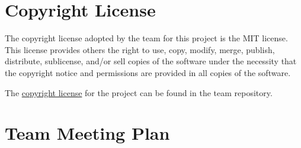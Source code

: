\documentclass{article}
\begin{document}
\section{Copyright License}
The copyright license adopted by the team for this project is the MIT license.
This license provides others the right to use, copy, modify, merge, publish,
distribute, sublicense, and/or sell copies of the software under the necessity
that the copyright notice and permissions are provided in all copies of the software.

The \href{https://github.com/M9Huynh/technically-functional/blob/f05da0acf59e6b8a08d67f9132471c1a17b5afef/LICENSE}{copyright license} for the project can be found in the team repository.

\section{Team Meeting Plan}
\end{document}
